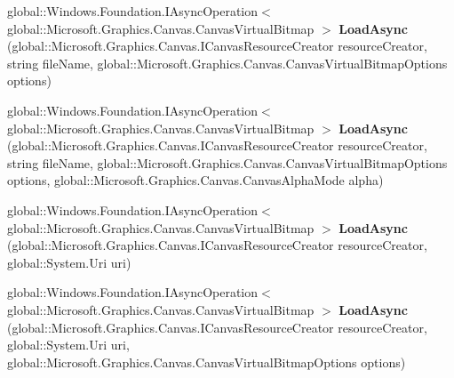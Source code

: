 \begin{DoxyCompactItemize}
\item 
\mbox{\label{interface_microsoft_1_1_graphics_1_1_canvas_1_1_i_canvas_virtual_bitmap_statics_a76a39d531ac6da083f15563d74ccbb82}} 
global\+::\+Windows.\+Foundation.\+I\+Async\+Operation$<$ global\+::\+Microsoft.\+Graphics.\+Canvas.\+Canvas\+Virtual\+Bitmap $>$ {\bfseries Load\+Async} (global\+::\+Microsoft.\+Graphics.\+Canvas.\+I\+Canvas\+Resource\+Creator resource\+Creator, string file\+Name, global\+::\+Microsoft.\+Graphics.\+Canvas.\+Canvas\+Virtual\+Bitmap\+Options options)
\item 
\mbox{\label{interface_microsoft_1_1_graphics_1_1_canvas_1_1_i_canvas_virtual_bitmap_statics_af2af584f62356eb886a700899215d4a6}} 
global\+::\+Windows.\+Foundation.\+I\+Async\+Operation$<$ global\+::\+Microsoft.\+Graphics.\+Canvas.\+Canvas\+Virtual\+Bitmap $>$ {\bfseries Load\+Async} (global\+::\+Microsoft.\+Graphics.\+Canvas.\+I\+Canvas\+Resource\+Creator resource\+Creator, string file\+Name, global\+::\+Microsoft.\+Graphics.\+Canvas.\+Canvas\+Virtual\+Bitmap\+Options options, global\+::\+Microsoft.\+Graphics.\+Canvas.\+Canvas\+Alpha\+Mode alpha)
\item 
\mbox{\label{interface_microsoft_1_1_graphics_1_1_canvas_1_1_i_canvas_virtual_bitmap_statics_a230e794a4930f665b4ac7d220c2671da}} 
global\+::\+Windows.\+Foundation.\+I\+Async\+Operation$<$ global\+::\+Microsoft.\+Graphics.\+Canvas.\+Canvas\+Virtual\+Bitmap $>$ {\bfseries Load\+Async} (global\+::\+Microsoft.\+Graphics.\+Canvas.\+I\+Canvas\+Resource\+Creator resource\+Creator, global\+::\+System.\+Uri uri)
\item 
\mbox{\label{interface_microsoft_1_1_graphics_1_1_canvas_1_1_i_canvas_virtual_bitmap_statics_ae4cad80705e97acdc853863be82a2edd}} 
global\+::\+Windows.\+Foundation.\+I\+Async\+Operation$<$ global\+::\+Microsoft.\+Graphics.\+Canvas.\+Canvas\+Virtual\+Bitmap $>$ {\bfseries Load\+Async} (global\+::\+Microsoft.\+Graphics.\+Canvas.\+I\+Canvas\+Resource\+Creator resource\+Creator, global\+::\+System.\+Uri uri, global\+::\+Microsoft.\+Graphics.\+Canvas.\+Canvas\+Virtual\+Bitmap\+Options options)

\end{DoxyCompactItemize}
